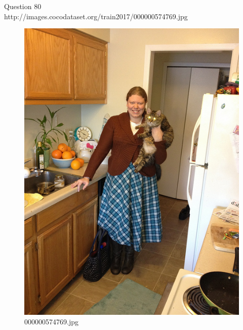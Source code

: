 Question 80\\
http://images.cocodataset.org/train2017/000000574769.jpg
\begin{figure}[h]
    \centering
    \includegraphics[width=0.8\linewidth]{../image set/hard/000000574769.jpg}
    \caption{000000574769.jpg}
\end{figure}
